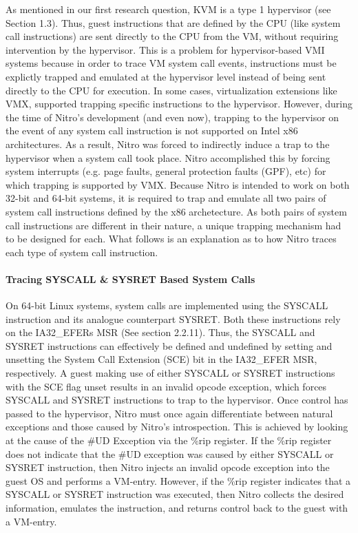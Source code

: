 \documentclass{report}
\begin{document}
\begin{spacing}{1.5}
{\large
As mentioned in our first research question, KVM is a type 1 hypervisor (see Section 1.3). Thus, guest instructions that are defined by the CPU (like system call instructions) are sent directly to the CPU from the VM, without requiring intervention by the hypervisor. This is a problem for hypervisor-based VMI systems because in order to trace VM system call events, instructions must be explictly trapped and emulated at the hypervisor level instead of being sent directly to the CPU for execution. In some cases, virtualization extensions like VMX, supported trapping specific instructions to the hypervisor. However, during the time of Nitro's development (and even now), trapping to the hypervisor on the event of any system call instruction is not supported on Intel x86 architectures. As a result, Nitro was forced to indirectly induce a trap to the hypervisor when a system call took place. Nitro accomplished this by forcing system interrupts (e.g. page faults, general protection faults (GPF), etc) for which trapping is supported by VMX. Because Nitro is intended to work on both 32-bit and 64-bit systems, it is required to trap and emulate all two pairs of system call instructions defined by the x86 archetecture. As both pairs of system call instructions are different in their nature, a unique trapping mechanism had to be designed for each. What follows is an explanation as to how Nitro traces each type of system call instruction.
\leavevmode\newline
}


\paragraph{Tracing SYSCALL \& SYSRET Based System Calls}

{\large
\leavevmode\newline
\leavevmode\newline
On 64-bit Linux systems, system calls are implemented using the SYSCALL instruction and its analogue counterpart SYSRET. Both these instructions rely on the IA32\_EFERs MSR (See section 2.2.11). Thus, the SYSCALL and SYSRET instructions can effectively be defined and undefined by setting and unsetting the System Call Extension (SCE) bit in the IA32\_EFER MSR, respectively. A guest making use of either SYSCALL or SYSRET instructions with the SCE flag unset results in an invalid opcode exception, which forces SYSCALL and SYSRET instructions to trap to the hypervisor. Once control has passed to the hypervisor, Nitro must once again differentiate between natural exceptions and those caused by Nitro's introspection. This is achieved by looking at the cause of the \#UD Exception via the \%rip register. If the \%rip register does not indicate that the \#UD exception was caused by either SYSCALL or SYSRET instruction, then Nitro injects an invalid opcode exception into the guest OS and performs a VM-entry. However, if the \%rip register indicates that a SYSCALL or SYSRET instruction was executed, then Nitro collects the desired information, emulates the instruction, and returns control back to the guest with a VM-entry.
\leavevmode\newline
}



\end{spacing}
\end{document}
